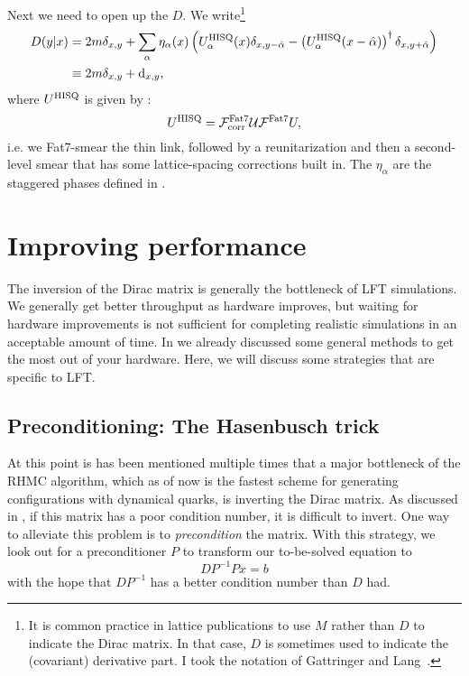 Next we need to open up the $D$. We write\footnote{It is common practice in
lattice publications to use $M$ rather than $D$ to indicate the Dirac matrix.
In that case, $D$ is sometimes used to indicate the (covariant) derivative part.
I took the notation of Gattringer and Lang~\cite{gattringer_quantum_2010}.}
\begin{equation}\begin{aligned}
D(y|x)&=2m\delta_{x,y}
+\sum_\alpha \eta_\alpha(x)\left(U^{\rm HISQ}_\alpha(x)\delta_{x,y-\hat\alpha}
-\left(U^{\rm HISQ}_\alpha(x-\hat\alpha)\right)^\dagger\delta_{x,y+\hat\alpha}\right)\\
&\equiv 2m\delta_{x,y}+\dd_{x,y},
\end{aligned}\end{equation}
where $U^{\rm HISQ}$ is given by :
\begin{equation}
U^{\rm HISQ}=\mathcal{F}^{\rm Fat7}_{\rm corr}\mathcal{U}\mathcal{F}^{\rm Fat7}U,
\end{equation} 
i.e. we Fat7-smear the thin link, followed
by a reunitarization and then a second-level smear that has some lattice-spacing
corrections built in. The $\eta_\alpha$ are the
staggered phases defined in .



\section{Improving performance}

The inversion of the Dirac matrix is generally the bottleneck of LFT
simulations. We generally get better throughput as hardware improves, 
but waiting for hardware improvements is not sufficient for completing realistic
simulations in an acceptable amount of time. In  we
already discussed some general methods to get the most out of your hardware.
Here, we will discuss some strategies that are specific to LFT.

\subsection{Preconditioning: The Hasenbusch trick}

At this point is has been mentioned multiple times that a major bottleneck
of the RHMC algorithm, which as of now is the fastest scheme for
generating configurations with dynamical quarks, is inverting the
Dirac matrix. As discussed in , if this matrix
has a poor condition number, it is difficult to invert.
One way to alleviate this problem is to {\it
precondition} the matrix. With this strategy,
we look out for a preconditioner $P$ to transform our to-be-solved equation to
\begin{equation}
DP^{-1}Px=b
\end{equation}
with the hope that $DP^{-1}$ has a better condition number than $D$ had.

